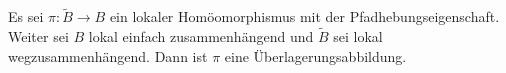 Es sei $\pi\colon \widetilde{B}\to B$ ein lokaler Homöomorphismus \pause mit der Pfadhebungseigenschaft. \pause Weiter sei $B$ lokal einfach zusammenhängend \pause und $\widetilde{B}$ sei lokal wegzusammenhängend. \pause Dann ist $\pi$ eine Überlagerungsabbildung.